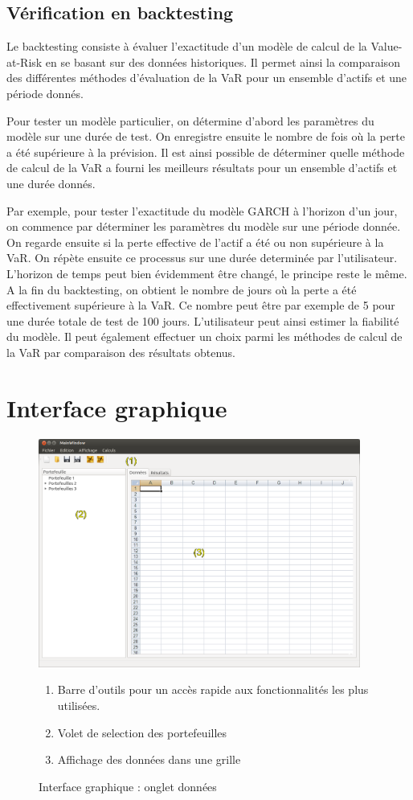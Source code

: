 	\subsection{Vérification en backtesting}
		Le backtesting consiste à évaluer l’exactitude d’un modèle de calcul de la Value-at-Risk en se basant sur des données historiques. Il permet ainsi la comparaison des différentes méthodes d’évaluation de la VaR pour un ensemble d’actifs et une période donnés.

		Pour tester un modèle particulier, on détermine d’abord les paramètres du modèle sur une durée de test. On enregistre ensuite le nombre de fois où la perte a été supérieure à la prévision. Il est ainsi possible de déterminer quelle méthode de calcul de la VaR a fourni les meilleurs résultats pour un ensemble d’actifs et une durée donnés.

		Par exemple, pour tester l’exactitude du modèle GARCH à l’horizon d’un jour, on commence par déterminer les paramètres du modèle sur une période donnée. On regarde ensuite si la perte effective de l’actif a été ou non supérieure à la VaR. On répète ensuite ce processus sur une durée determinée par l’utilisateur. L’horizon de temps peut bien évidemment être changé, le principe reste le même. A la fin du backtesting, on obtient le nombre de jours où la perte a été effectivement supérieure à la VaR. Ce nombre peut être par exemple de 5 pour une durée totale de test de 100 jours. L’utilisateur peut ainsi estimer la fiabilité du modèle. Il peut également effectuer un choix parmi les méthodes de calcul de la VaR par comparaison des résultats obtenus.



\section{Interface graphique}

	\begin{figure}[h]
		\includegraphics[width=400px]{logicielDonnees.png}
		\caption{Interface graphique : onglet données}
		\label{interface}
		\begin{enumerate}
			\item Barre d’outils pour un accès rapide aux fonctionnalités les plus utilisées.
			\item Volet de selection des portefeuilles
			\item Affichage des données dans une grille 
		\end{enumerate}
	\end{figure}

